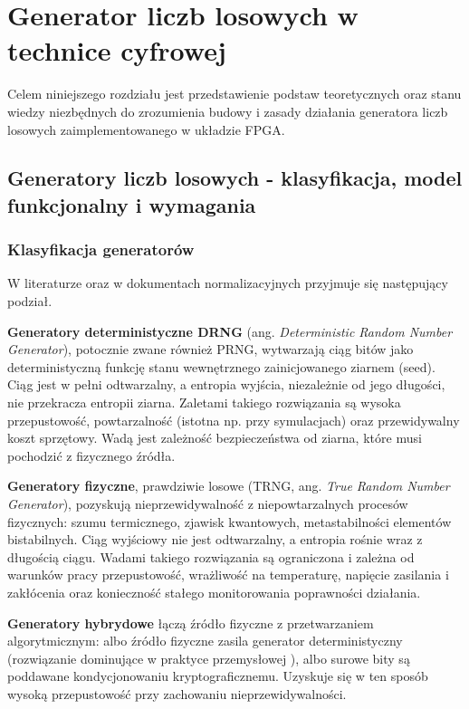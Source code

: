 \chapter{Generator liczb losowych w technice cyfrowej}

Celem niniejszego rozdziału jest przedstawienie podstaw teoretycznych oraz stanu
wiedzy niezbędnych do zrozumienia budowy i zasady działania generatora liczb
losowych zaimplementowanego w układzie FPGA.

\section{Generatory liczb losowych - klasyfikacja, model funkcjonalny i wymagania}

\subsection{Klasyfikacja generatorów}

W literaturze oraz w dokumentach normalizacyjnych \cite{nist_sp80090c}
przyjmuje się następujący podział.

\textbf{Generatory deterministyczne DRNG} (ang. \emph{Deterministic Random Number
Generator}), potocznie zwane również PRNG, wytwarzają ciąg bitów jako
deterministyczną funkcję stanu wewnętrznego zainicjowanego ziarnem (seed).
Ciąg jest w pełni odtwarzalny, a entropia wyjścia, niezależnie od jego
długości, nie przekracza entropii ziarna. Zaletami takiego rozwiązania są
wysoka przepustowość, powtarzalność (istotna np. przy symulacjach) oraz
przewidywalny koszt sprzętowy. Wadą jest zależność bezpieczeństwa od ziarna,
które musi pochodzić z fizycznego źródła.

\textbf{Generatory fizyczne}, prawdziwie losowe (TRNG, ang. \emph{True Random Number
Generator}), pozyskują nieprzewidywalność z niepowtarzalnych procesów
fizycznych: szumu termicznego, zjawisk kwantowych, metastabilności elementów
bistabilnych. Ciąg wyjściowy nie jest odtwarzalny, a entropia rośnie wraz
z długością ciągu. Wadami takiego rozwiązania są ograniczona i zależna od
warunków pracy przepustowość, wrażliwość na temperaturę, napięcie zasilania
i zakłócenia oraz konieczność stałego monitorowania poprawności działania.

\textbf{Generatory hybrydowe} łączą źródło fizyczne z przetwarzaniem algorytmicznym:
albo źródło fizyczne zasila generator deterministyczny (rozwiązanie dominujące
w praktyce przemysłowej \cite{killmann2011ais31}), albo surowe bity są
poddawane kondycjonowaniu kryptograficznemu. Uzyskuje się w ten sposób wysoką
przepustowość przy zachowaniu nieprzewidywalności.

